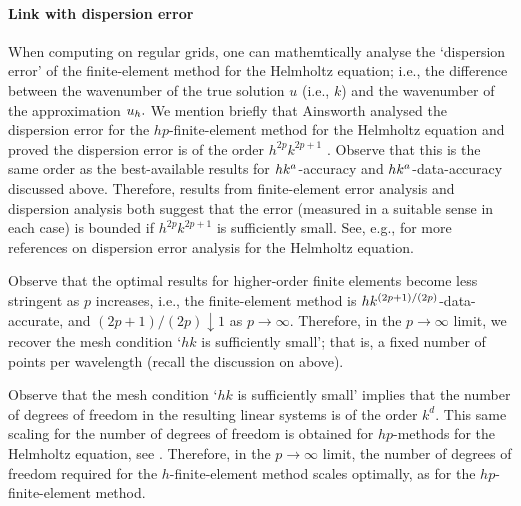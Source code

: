 \paragraph{Link with dispersion error} When computing on regular grids, one can mathemtically analyse the `dispersion error' of the finite-element method for the Helmholtz equation; i.e., the difference between the wavenumber of the true solution $u$ (i.e., $k$) and the wavenumber of the approximation $u_{h}.$ We mention briefly that Ainsworth  analysed the dispersion error for the $hp$-finite-element method for the Helmholtz equation and proved the dispersion error is of the order $h^{2p}k^{2p+1}$ \cite[Equation (3.5)]{Ai:04}. Observe that this is the same order as the best-available results for $hk^{a}$-accuracy and $hk^{a}$-data-accuracy discussed above. Therefore, results from finite-element error analysis and dispersion analysis both suggest that the error (measured in a suitable sense in each case) is bounded if $h^{2p}k^{2p+1}$ is sufficiently small. See, e.g., \cite[Remark 5.3(a)]{DuWu:15} for more references on dispersion error analysis for the Helmholtz equation.

Observe that the optimal results for higher-order finite elements become less stringent as $p$ increases, i.e., the finite-element method is $hk^{(2p+1)/(2p)}$-data-accurate, and $(2p+1)/(2p) \downarrow 1$ as $p \rightarrow \infty.$ Therefore, in the $p\rightarrow \infty$ limit, we recover the mesh condition `$hk$ is sufficiently small'; that is, a fixed number of points per wavelength (recall the discussion on  above).

Observe that the mesh condition `$hk$ is sufficiently small' implies that the number of degrees of freedom in the resulting linear systems is of the order $k^d.$ This same scaling for the number of degrees of freedom is obtained for $hp$-methods for the Helmholtz equation, see \cite[Remark 5.9]{MeSa:11}. Therefore, in the $p\rightarrow\infty$ limit, the number of degrees of freedom required for the $h$-finite-element method scales optimally, as for the $hp$-finite-element method.
\ere


